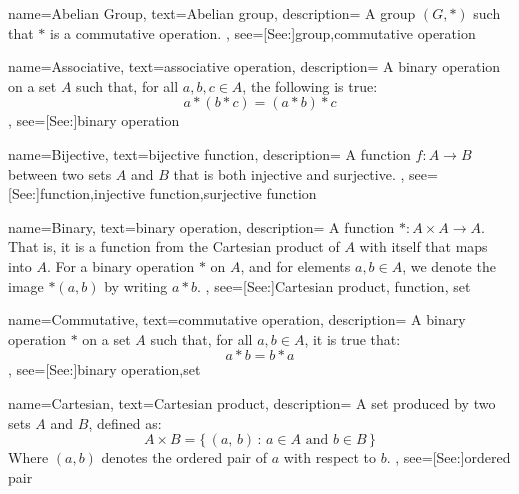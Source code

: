 {
    name={Abelian Group},
    text={Abelian group},
    description={
        A group $(G,*)$ such that $*$ is a commutative operation.
    },
    see=[See:]{group,commutative operation}
}

{
    name={Associative},
    text={associative operation},
    description={
        A binary operation on a set $A$ such that, for all $a,b,c\in{A}$,
        the following is true:
        \begin{equation*}
            a*(b*c)=(a*b)*c
        \end{equation*}
    },
    see=[See:]{binary operation}
}

{
    name={Bijective},
    text={bijective function},
    description={
        A function $f:A\rightarrow{B}$ between two sets $A$ and $B$ that
        is both injective and surjective.
    },
    see=[See:]{function,injective function,surjective function}
}

{
    name={Binary},
    text={binary operation},
    description={
        A function $*:A\times{A}\rightarrow{A}$. That is, it is a function
        from the Cartesian product of $A$ with itself that maps into $A$.
        For a binary operation $*$ on $A$, and for elements $a,b\in{A}$,
        we denote the image $*(a,b)$ by writing $a*b$.
    },
    see=[See:]{Cartesian product, function, set}
}

{
    name={Commutative},
    text={commutative operation},
    description={
        A binary operation $*$ on a set $A$ such that, for all $a,b\in{A}$,
        it is true that:
        \begin{equation}
            a*b=b*a
        \end{equation}
    },
    see=[See:]{binary operation,set}
}

{
    name={Cartesian},
    text={Cartesian product},
    description={
        A set produced by two sets $A$ and $B$, defined as:
        \begin{equation*}
            A\times{B}=\{\,(a,\,b)\,:\,a\in{A}\textrm{ and }b\in{B}\,\}
        \end{equation*}
        Where $(a,b)$ denotes the ordered pair of $a$ with respect to $b$.
    },
    see=[See:]{ordered pair}
}

